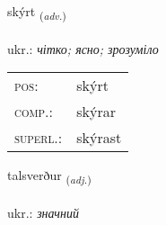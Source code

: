 \documentclass[frontgrid, backgrid]{flacards}\usepackage[]{graphicx}\usepackage[]{xcolor}
\begin{document}
\renewcommand{\flhead}{\vskip5pt \fboxsep=0pt {\small\bfseries\footnotesize Atviksorð | прислівник}}
\renewcommand{\fcfoot}{\vskip5pt \fboxsep=0pt \hspace{2pt}{\small\bfseries\footnotesize 2K}}

\renewcommand{\blhead}{\vskip5pt {\small\bfseries\footnotesize Atviksorð | прислівник }}
\renewcommand{\bcfoot}{\vskip5pt \hspace{2pt}{\small\bfseries\footnotesize 2K}}


{skýrt \small{\textsubscript{(\textit{adv.})}} \\[1ex] %
\textphonetic{[scir̥t]} \\
ukr.: \emph{чітко; ясно; зрозуміло} \\  [2ex]
\renewcommand*{\arraystretch}{0.8}
\begin{tabular}{ll}
\textsc{pos}: & skýrt \\ 
\textsc{comp.}: & skýrar \\ 
\textsc{superl.}: & skýrast \\
\end{tabular}
}

\renewcommand{\flhead}{\vskip5pt \fboxsep=0pt {\small\bfseries\footnotesize Lýsingarorð | прикметник}}
\renewcommand{\fcfoot}{\vskip5pt \fboxsep=0pt \hspace{2pt}{\small\bfseries\footnotesize 2K}}

\renewcommand{\blhead}{\vskip5pt {\small\bfseries\footnotesize Lýsingarorð | прикметник }}
\renewcommand{\bcfoot}{\vskip5pt \hspace{2pt}{\small\bfseries\footnotesize 2K}}


{talsverður \small{\textsubscript{(\textit{adj.})}} \\[1ex] %
\textphonetic{[tʰalsvɛrðʏr]} \\
ukr.: \emph{значний} \\  [2ex]
\renewcommand*{\arraystretch}{0.8}
}
\end{document}
